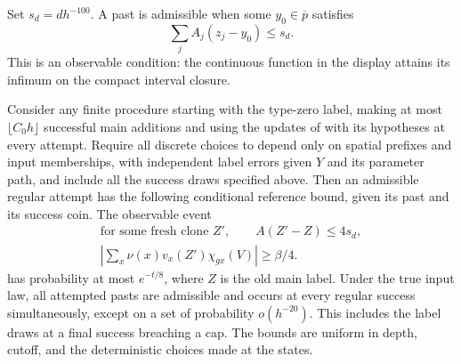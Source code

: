 Set $s_d=dh^{-100}$.  A past is admissible when some
$y_0\in\overline p$ satisfies
\[
 \sum_jA_j(z_j-y_0)\le s_d.
\]
This is an observable condition: the continuous function in the display
attains its infimum on the compact interval closure.

\begin{proposition}\label{prop:thermal-evidence}
Consider any finite procedure starting with the type-zero label, making
at most $\lfloor C_0h\rfloor$ successful main additions and using the
updates of  with its hypotheses at every
attempt.  Require all discrete choices to depend only on spatial
prefixes and input memberships, with independent label errors given
$Y$ and its parameter path, and include all the success draws specified
above.  Then an admissible regular attempt
has the following conditional reference bound, given its past and its
success coin.  The observable event
\begin{equation}\label{eq:source-10}
 \begin{gathered}
 \text{for some fresh clone }Z',\qquad A(Z'-Z)\le4s_d,\\
 \left|\sum_x\nu(x)v_x(Z')\chi_{gx}(V)\right|\ge\beta/4.
 \end{gathered}
\end{equation}
has probability at most $e^{-t/8}$, where $Z$ is the old main label.
Under the true input law, all attempted pasts are admissible and
 occurs at every regular success simultaneously,
except on a set of probability $o(h^{-20})$.  This includes the label
draws at a final success breaching a cap.  The bounds are uniform in
depth, cutoff, and the deterministic choices made at the states.
\end{proposition}

